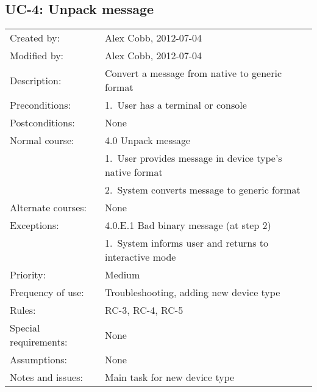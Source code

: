 \documentclass[pdftex,oneside,12pt,a4paper]{book}
\begin{document}
\subsection{UC-4: Unpack message}
\begin{tabular}{|l|p{10cm}|}\hline
Created by: & Alex Cobb, 2012-07-04 \\
Modified by: & Alex Cobb, 2012-07-04 \\\hline
Description: & Convert a message from native to generic format \\\hline
Preconditions: & 1.\ User has a terminal or console \\\hline
Postconditions: & None \\\hline
Normal course: & 4.0 Unpack message\\
 & 1.\ User provides message in device type's native format \\
 & 2.\ System converts message to generic format\\\hline
Alternate courses: & None\\\hline
Exceptions: & 4.0.E.1 Bad binary message (at step 2)\\
 & 1.\ System informs user and returns to interactive mode\\\hline
Priority: & Medium \\\hline
Frequency of use: & Troubleshooting, adding new device type\\\hline
Rules: & RC-3, RC-4, RC-5\\\hline
Special requirements: & None\\\hline
Assumptions: & None\\\hline
Notes and issues: & Main task for new device type\\\hline
\end{tabular}
\end{document}
